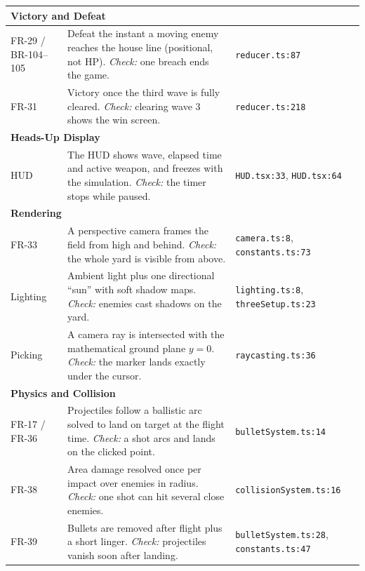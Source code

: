 \documentclass[12pt,a4paper]{report}
\begin{document}
\begin{longtable}{|p{1.5cm}|p{7.9cm}|p{4.2cm}|}
\multicolumn{3}{|l|}{\textbf{Victory and Defeat}} \\ \hline
FR-29 / BR-104--105 & Defeat the instant a moving enemy reaches the house line (positional, not HP). \emph{Check:} one breach ends the game. & \texttt{reducer.ts:87} \\ \hline
FR-31 & Victory once the third wave is fully cleared. \emph{Check:} clearing wave 3 shows the win screen. & \texttt{reducer.ts:218} \\ \hline

\multicolumn{3}{|l|}{\textbf{Heads-Up Display}} \\ \hline
HUD & The HUD shows wave, elapsed time and active weapon, and freezes with the simulation. \emph{Check:} the timer stops while paused. & \texttt{HUD.tsx:33}, \texttt{HUD.tsx:64} \\ \hline

\multicolumn{3}{|l|}{\textbf{Rendering}} \\ \hline
FR-33 & A perspective camera frames the field from high and behind. \emph{Check:} the whole yard is visible from above. & \texttt{camera.ts:8}, \texttt{constants.ts:73} \\ \hline
Lighting & Ambient light plus one directional ``sun'' with soft shadow maps. \emph{Check:} enemies cast shadows on the yard. & \texttt{lighting.ts:8}, \texttt{threeSetup.ts:23} \\ \hline
Picking & A camera ray is intersected with the mathematical ground plane $y=0$. \emph{Check:} the marker lands exactly under the cursor. & \texttt{raycasting.ts:36} \\ \hline

\multicolumn{3}{|l|}{\textbf{Physics and Collision}} \\ \hline
FR-17 / FR-36 & Projectiles follow a ballistic arc solved to land on target at the flight time. \emph{Check:} a shot arcs and lands on the clicked point. & \texttt{bulletSystem.ts:14} \\ \hline
FR-38 & Area damage resolved once per impact over enemies in radius. \emph{Check:} one shot can hit several close enemies. & \texttt{collisionSystem.ts:16} \\ \hline
FR-39 & Bullets are removed after flight plus a short linger. \emph{Check:} projectiles vanish soon after landing. & \texttt{bulletSystem.ts:28}, \texttt{constants.ts:47} \\ \hline


\end{longtable}
\end{document}
